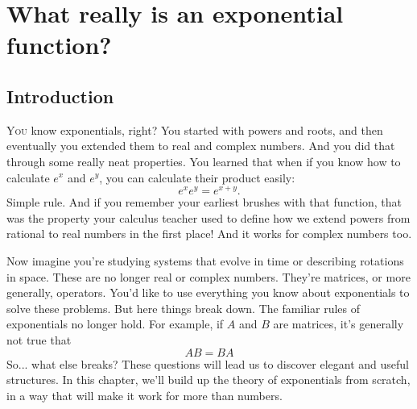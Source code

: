 



\chapter{What really is an exponential function?}

\section{Introduction}

\lettrine{Y}{ou} know exponentials, right? You started with powers and roots, and then eventually you extended them to real and complex numbers. And you did that through some really neat properties. You learned that when if you know how to calculate $e^x$ and $e^y$, you can calculate their product easily:
\begin{equation}
    e^{x}e^{y} = e^{x + y}.
\end{equation}
Simple rule. And if you remember your earliest brushes with that function, that was the property your calculus teacher used to define how we extend powers from rational to real numbers in the first place! And it works for complex numbers too.

Now imagine you're studying systems that evolve in time or describing rotations in space. These are no longer real or complex numbers. They're matrices, or more generally, operators. You'd like to use everything you know about exponentials to solve these problems. But here things break down. The familiar rules of exponentials no longer hold. For example, if $A$ and $B$ are matrices, it's generally not true that
\begin{equation}
    AB = BA
\end{equation}
So... what else breaks? These questions will lead us to discover elegant and useful structures. In this chapter, we'll build up the theory of exponentials from scratch, in a way that will make it work for more than numbers.

